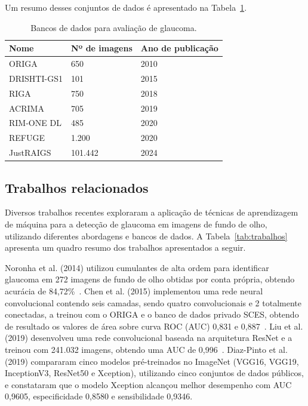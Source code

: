 \documentclass[12pt]{article}
\begin{document}
Um resumo desses conjuntos de dados é apresentado na Tabela~\ref{tab:datasets}.

\begin{table}[htb]
    \centering
    \begin{tabularx}{\textwidth}{XXX}
    \toprule
    \textbf{Nome} & \textbf{Nº de imagens} & \textbf{Ano de publicação} \\
    \midrule
    ORIGA & 650 & 2010 \\
    DRISHTI-GS1 & 101 & 2015 \\
    RIGA & 750 & 2018 \\
    ACRIMA & 705 & 2019 \\
    RIM-ONE DL & 485 & 2020 \\
    REFUGE & 1.200 & 2020 \\
    JustRAIGS & 101.442 & 2024 \\
    \bottomrule
    \end{tabularx}
    \caption{Bancos de dados para avaliação de glaucoma.}
    \label{tab:datasets}
\end{table}

\subsection{Trabalhos relacionados}
\label{sec:review:related}

Diversos trabalhos recentes exploraram a aplicação de técnicas de aprendizagem de máquina para a detecção de glaucoma em imagens de fundo de olho, utilizando diferentes abordagens e bancos de dados. A Tabela~\ref{tab:trabalhos} apresenta um quadro resumo dos trabalhos apresentados a seguir.

Noronha et al. (2014) utilizou cumulantes de alta ordem para identificar glaucoma em 272 imagens de fundo de olho obtidas por conta própria, obtendo acurácia de 84,72\%~\cite{noronha2014hoc}. Chen et al. (2015) implementou uma rede neural convolucional contendo seis camadas, sendo quatro convolucionais e 2 totalmente conectadas, a treinou com o ORIGA e o banco de dados privado SCES, obtendo de resultado os valores de área sobre curva ROC (AUC) 0,831 e 0,887~\cite{chen2015cnn}. Liu et al. (2019) desenvolveu uma rede convolucional baseada na arquitetura ResNet e a treinou com 241.032 imagens, obtendo uma AUC de 0,996~\cite{liu_cnn_2019}. Diaz-Pinto et al. (2019) compararam cinco modelos pré-treinados no ImageNet (VGG16, VGG19, InceptionV3, ResNet50 e Xception), utilizando cinco conjuntos de dados públicos, e constataram que o modelo Xception alcançou melhor desempenho com AUC 0,9605, especificidade 0,8580 e sensibilidade 0,9346.
\end{document}
